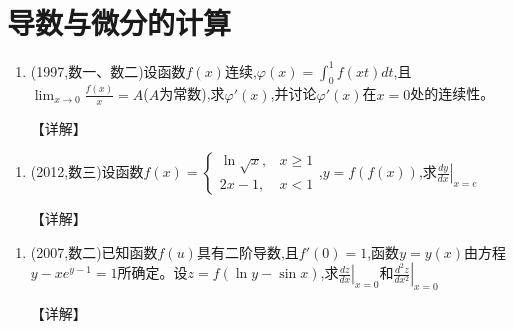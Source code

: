 \documentclass[12pt, a4paper, oneside, UTF8]{ctexbook}
\begin{document}
\section{导数与微分的计算}

\begin{remark}
\end{remark}

\begin{enumerate}[label=\arabic*.,start=4]
    \item (1997,数一、数二)设函数$f(x)$连续,$\varphi(x)=\int_0^1 f(xt)dt$,且$\lim_{x\to0}\frac{f(x)}{x}=A$($A$为常数),求$\varphi'(x)$,并讨论$\varphi'(x)$在$x=0$处的连续性。
    
    \begin{solution}
    【详解】
    \end{solution}
\end{enumerate}

\begin{remark}
\end{remark}

\begin{enumerate}[label=\arabic*.,start=5]
    \item (2012,数三)设函数$f(x)=\begin{cases}
        \ln\sqrt{x}, & x\geq1 \\
        2x-1, & x<1
    \end{cases}$,$y=f(f(x))$,求$\left.\frac{dy}{dx}\right|_{x=e}$
    
    \begin{solution}
    【详解】
    \end{solution}
\end{enumerate}

\begin{remark}
\end{remark}

\begin{enumerate}[label=\arabic*.,start=6]
    \item (2007,数二)已知函数$f(u)$具有二阶导数,且$f'(0)=1$,函数$y=y(x)$由方程$y-xe^{y-1}=1$所确定。设$z=f(\ln y-\sin x)$,求$\left.\frac{dz}{dx}\right|_{x=0}$和$\left.\frac{d^2z}{dx^2}\right|_{x=0}$
    
    \begin{solution}
    【详解】
    \end{solution}
\end{enumerate}

\begin{remark}
\end{remark}
\end{document}
